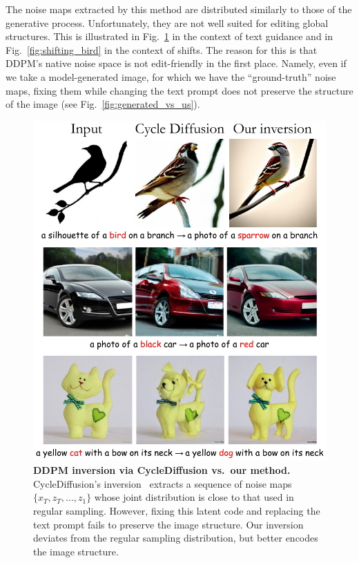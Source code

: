 The noise maps extracted by this method are distributed similarly to those of the generative process. Unfortunately, they are not well suited for editing global structures. This is illustrated in Fig.~\ref{fig:cyclediffusion_vs_us} in the context of text guidance and in Fig.~\ref{fig:shifting_bird} in the context of shifts. The reason for this is that DDPM's native noise space is not edit-friendly in the first place. Namely, even if we take a model-generated image, for which we have the ``ground-truth'' noise maps, fixing them while changing the text prompt does not preserve the structure of the image (see Fig.~\ref{fig:generated_vs_us}).



\begin{figure}
\centering
\includegraphics[width=0.94\columnwidth]{ICCV23_submission/figures/Cycle-Diffusion.pdf}
\caption{\textbf{DDPM inversion via CycleDiffusion vs.~our method.} CycleDiffusion's inversion~\cite{Wu22} extracts a sequence of noise maps $\{x_T,z_T,\ldots,z_1\}$ whose joint distribution is close to that used in regular sampling. However, fixing this latent code and replacing the text prompt fails to preserve the image structure. Our inversion deviates from the regular sampling distribution, but better encodes the image structure.}
\label{fig:cyclediffusion_vs_us}
\end{figure}


